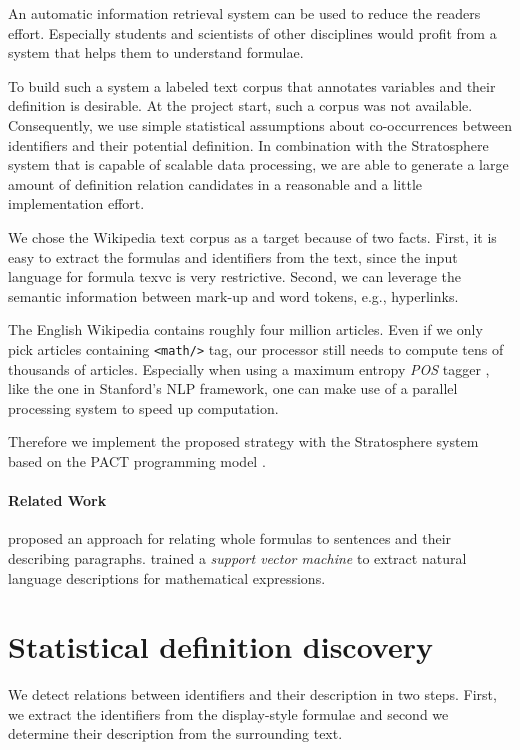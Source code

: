 \documentclass[runningheads]{llncs}
\begin{document}
An automatic information retrieval system can be used to reduce the readers
effort. Especially students and scientists of other
disciplines would profit from a system that helps them to understand formulae.

To build such a system a labeled text corpus that annotates variables
and their definition is desirable. At the project start, such a corpus was not available.
Consequently, we use simple statistical assumptions about co-occurrences between identifiers
and their potential definition. In combination with the Stratosphere system
that is capable of scalable data processing,  we are able to generate a large amount of 
definition relation candidates in a reasonable and a little implementation effort.

We chose the Wikipedia text corpus as a target because of two facts.
First, it is easy to extract the formulas and identifiers from the text,
since the input language for formula texvc is very restrictive.
Second, we can leverage the semantic information between mark-up and
word tokens, e.g., hyperlinks.

The English Wikipedia contains roughly four million articles. Even if we only
pick articles containing \texttt{<math/>} tag, our processor still needs
to compute tens of thousands of articles. Especially when using a maximum
entropy \emph{POS} tagger \cite{Rathna96}, like the one in Stanford's NLP
framework, one can make use of a parallel processing system to speed up
computation.

Therefore we implement the proposed strategy with the Stratosphere system based
on the PACT programming model \cite{Alexandrov2010}.


\paragraph{Related Work}
\citeauthor{Quoc2010}\cite{Quoc2010} proposed an approach for
relating whole formulas to sentences and their describing paragraphs.
\citeauthor{Yokoi}\cite{Yokoi} trained a \emph{support vector machine} to extract
natural language descriptions for mathematical expressions.


\section{Statistical definition discovery}
We detect relations between identifiers and their description in two steps.
First, we extract the identifiers from the display-style formulae and
second we determine their description from the surrounding text.
\end{document}

